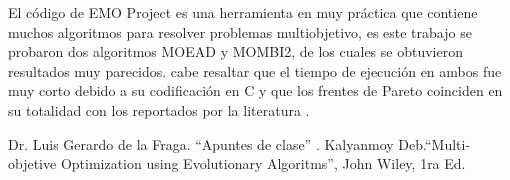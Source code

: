 \documentclass[conference]{IEEEtran}
\begin{document}
El código de EMO Project es una herramienta en muy práctica que contiene muchos algoritmos para resolver problemas multiobjetivo, es este trabajo se probaron dos algoritmos MOEAD y MOMBI2, de los cuales se obtuvieron resultados muy parecidos. cabe resaltar que el tiempo de ejecución en ambos fue muy corto debido a su codificación en C y que los frentes de Pareto coinciden en su totalidad con los reportados por la literatura \cite{b2}.


\begin{thebibliography}{00}
  Dr. Luis Gerardo de la Fraga. ``Apuntes de clase'' .
 Kalyanmoy Deb.``Multi-objetive Optimization using Evolutionary Algoritms'', John Wiley, 1ra Ed.
\end{thebibliography}
\end{document}
